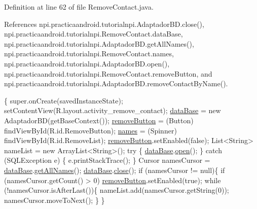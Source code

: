 Definition at line 62 of file Remove\-Contact.\-java.



References npi.\-practicaandroid.\-tutorialnpi.\-Adaptador\-B\-D.\-close(), npi.\-practicaandroid.\-tutorialnpi.\-Remove\-Contact.\-data\-Base, npi.\-practicaandroid.\-tutorialnpi.\-Adaptador\-B\-D.\-get\-All\-Names(), npi.\-practicaandroid.\-tutorialnpi.\-Remove\-Contact.\-names, npi.\-practicaandroid.\-tutorialnpi.\-Adaptador\-B\-D.\-open(), npi.\-practicaandroid.\-tutorialnpi.\-Remove\-Contact.\-remove\-Button, and npi.\-practicaandroid.\-tutorialnpi.\-Adaptador\-B\-D.\-remove\-Contact\-By\-Name().


\begin{DoxyCode}
                                                       \{
        super.onCreate(savedInstanceState);
        setContentView(R.layout.activity\_remove\_contact);
        \hyperlink{classnpi_1_1practicaandroid_1_1tutorialnpi_1_1_remove_contact_a27f0a542a3a17b1fd5f4afd9fb7f93e4}{dataBase} = \textcolor{keyword}{new} AdaptadorBD(getBaseContext());
        \hyperlink{classnpi_1_1practicaandroid_1_1tutorialnpi_1_1_remove_contact_aa9dcb9cb24640807d67d9bb4db3a83f7}{removeButton} = (Button) findViewById(R.id.RemoveButton);
        \hyperlink{classnpi_1_1practicaandroid_1_1tutorialnpi_1_1_remove_contact_a3107d242c1dd4ee41c561a9d11b9b8fd}{names} = (Spinner) findViewById(R.id.RemoveList);
        \hyperlink{classnpi_1_1practicaandroid_1_1tutorialnpi_1_1_remove_contact_aa9dcb9cb24640807d67d9bb4db3a83f7}{removeButton}.setEnabled(\textcolor{keyword}{false});
        List<String> nameList = \textcolor{keyword}{new} ArrayList<String>();
        \textcolor{keywordflow}{try} \{
            \hyperlink{classnpi_1_1practicaandroid_1_1tutorialnpi_1_1_remove_contact_a27f0a542a3a17b1fd5f4afd9fb7f93e4}{dataBase}.\hyperlink{classnpi_1_1practicaandroid_1_1tutorialnpi_1_1_adaptador_b_d_a128413ac90cfc708b95c21d946f9600d}{open}();
        \} \textcolor{keywordflow}{catch} (SQLException e) \{
            e.printStackTrace();
        \}
        Cursor namesCursor = \hyperlink{classnpi_1_1practicaandroid_1_1tutorialnpi_1_1_remove_contact_a27f0a542a3a17b1fd5f4afd9fb7f93e4}{dataBase}.\hyperlink{classnpi_1_1practicaandroid_1_1tutorialnpi_1_1_adaptador_b_d_ab57b493581975afbbf05b835c4fa4f21}{getAllNames}();
        \hyperlink{classnpi_1_1practicaandroid_1_1tutorialnpi_1_1_remove_contact_a27f0a542a3a17b1fd5f4afd9fb7f93e4}{dataBase}.\hyperlink{classnpi_1_1practicaandroid_1_1tutorialnpi_1_1_adaptador_b_d_a466dc4c61ae61457cf986b5d8c6f6f52}{close}();
        \textcolor{keywordflow}{if} (namesCursor != null)\{
            \textcolor{keywordflow}{if} (namesCursor.getCount() > 0)
                \hyperlink{classnpi_1_1practicaandroid_1_1tutorialnpi_1_1_remove_contact_aa9dcb9cb24640807d67d9bb4db3a83f7}{removeButton}.setEnabled(\textcolor{keyword}{true});
            \textcolor{keywordflow}{while} (!namesCursor.isAfterLast())\{
                nameList.add(namesCursor.getString(0));
                namesCursor.moveToNext();
            \}
        \}
        

\end{DoxyCode}
